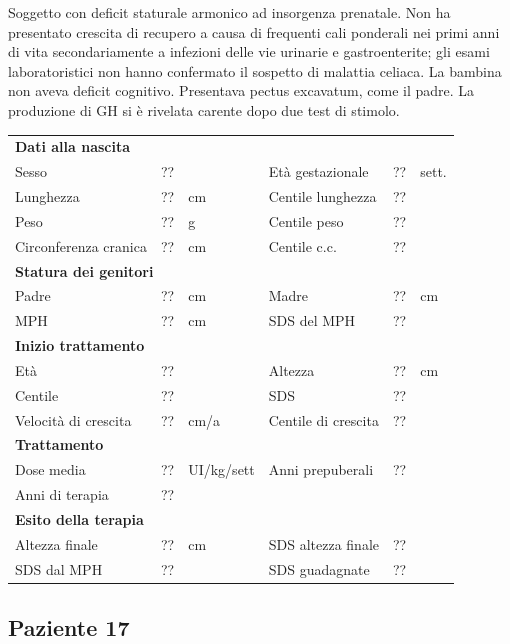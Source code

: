 Soggetto con deficit staturale armonico ad insorgenza prenatale. Non ha presentato crescita di recupero a causa di frequenti cali ponderali nei primi anni di vita secondariamente a infezioni delle vie urinarie e gastroenterite; gli esami laboratoristici non hanno confermato il sospetto di malattia celiaca. La bambina non aveva deficit cognitivo. Presentava pectus excavatum, come il padre. La produzione di GH si è rivelata carente dopo due test di stimolo. 

\begin{table}[!h]
\begin{tabular}{lrllrl}
\toprule
\multicolumn{6}{l}{\textbf{Dati alla nascita}}\\
Sesso 		& \multicolumn{2}{l}{??} 	& Età gestazionale 		& ?? 		& sett.\\
Lunghezza 	& ?? 		& cm 				& Centile lunghezza		& ?? 		\\
Peso 		& ?? 		& g					& Centile peso			& ?? 		\\
Circonferenza cranica	& ?? 		& cm 	& Centile c.c.			& ?? \\
\midrule
\multicolumn{6}{l}{\textbf{Statura dei genitori}}\\
Padre 		& ?? & cm 	& Madre 				& ?? & cm \\
MPH 		& ?? & cm 	& SDS del MPH 			& ??\\
\midrule
\multicolumn{6}{l}{\textbf{Inizio trattamento}} \\
Età	& ?? & 		& Altezza 				& ?? & cm  \\
Centile & ?? 	 &		& SDS		& ?? \\
Velocità di crescita & ?? & cm/a	& Centile di crescita & ??\\
\midrule
\multicolumn{6}{l}{\textbf{Trattamento}} \\
Dose media		& ?? & UI/kg/sett & Anni prepuberali & ??\\
Anni di terapia & ??\\
\midrule
\multicolumn{6}{l}{\textbf{Esito della terapia}} \\
Altezza finale			& ?? & cm 	& SDS altezza finale		& ??\\
SDS dal MPH				& ?? &		& SDS guadagnate 			& ??\\
\bottomrule
\end{tabular}
\end{table}
\clearpage


\subsection*{Paziente 17}%

